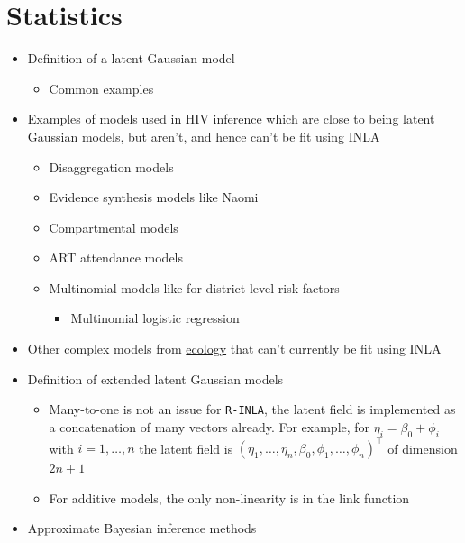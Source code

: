 \documentclass[a4paper, nobind]{templates/ociamthesis}
\providecommand{\tightlist}{%
  \setlength{\itemsep}{0pt}\setlength{\parskip}{0pt}}
\begin{document}
\hypertarget{statistics}{%
\section{Statistics}\label{statistics}}

\begin{itemize}
\tightlist
\item
  Definition of a latent Gaussian model \autocite{rue2009approximate}

  \begin{itemize}
  \tightlist
  \item
    Common examples
  \end{itemize}
\item
  Examples of models used in HIV inference which are close to being latent Gaussian models, but aren't, and hence can't be fit using INLA

  \begin{itemize}
  \tightlist
  \item
    Disaggregation models
  \item
    Evidence synthesis models like Naomi \autocite{eaton2021naomi,eaton2019joint}
  \item
    Compartmental models
  \item
    ART attendance models
  \item
    Multinomial models like for district-level risk factors

    \begin{itemize}
    \tightlist
    \item
      Multinomial logistic regression
    \end{itemize}
  \end{itemize}
\item
  Other complex models from \href{https://www.bioss.ac.uk/rsse/2013/September2013slides-Illian.pdf}{ecology} that can't currently be fit using INLA
\item
  Definition of extended latent Gaussian models \autocite{stringer2021fast}

  \begin{itemize}
  \tightlist
  \item
    Many-to-one is not an issue for \texttt{R-INLA}, the latent field is implemented as a concatenation of many vectors already. For example, for \(\eta_i = \beta_0 + \phi_i\) with \(i = 1, \ldots, n\) the latent field is \((\eta_1, \ldots, \eta_n, \beta_0, \phi_1, \ldots, \phi_n)^\top\) of dimension \(2n + 1\)
  \item
    For additive models, the only non-linearity is in the link function
  \end{itemize}
\item
  Approximate Bayesian inference methods


\end{itemize}
\end{document}
